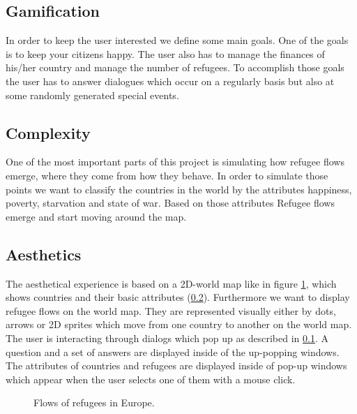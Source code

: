 \documentclass{acm_proc_article-sp}
\begin{document}
\subsection{Gamification}
\label{gamification}
In order to keep the user interested we define some main goals. One of the goals is to keep your citizens happy. The user also has to manage the finances of his/her country and manage the number of refugees. To accomplish those goals the user has to answer dialogues which occur on a regularly basis but also at some randomly generated special events. 
\subsection{Complexity}
\label{complexity}
One of the most important parts of this project is simulating how refugee flows emerge, where they come from how they behave. In order to simulate those points we want to classify the countries in the world by the attributes happiness, poverty, starvation and state of war. Based on those attributes Refugee flows emerge and start moving around the map.
\subsection{Aesthetics}
The aesthetical experience is based on a 2D-world map like in figure \ref{europe}, which shows countries and their basic attributes (\ref{complexity}). Furthermore we want to display refugee flows on the world map. They are represented visually  either  by dots, arrows or 2D sprites which move from one country to another on the world map. The user is interacting through dialogs which pop up as described in \ref{gamification}. A question and a set of answers are displayed inside of the up-popping windows. The attributes of countries and refugees are displayed inside of pop-up windows which appear when the user selects one of them with a mouse click.

\begin{figure}
\centering
{}
\caption{Flows of refugees in Europe.}
\label{europe}
\end{figure}
\end{document}
